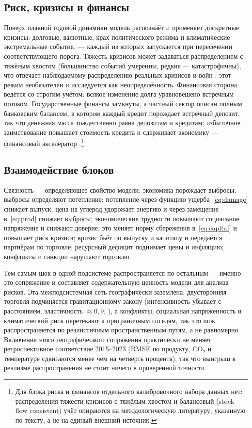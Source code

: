 \documentclass[11pt,a4paper]{article}
\begin{document}
\subsection{Риск, кризисы и финансы}

Поверх плавной годовой динамики модель распознаёт и применяет дискретные кризисы:
долговые, валютные, крах политического режима и климатические экстремальные события, ---
каждый из которых запускается при пересечении соответствующего порога. Тяжесть кризисов
может задаваться распределением с тяжёлым хвостом (большинство событий умеренны, редкие ---
катастрофичны), что отвечает наблюдаемому распределению реальных кризисов и войн
\citep{taleb2007,weitzman2009}; этот режим необязателен и исследуется как
неопределённость. Финансовая сторона ведётся со строгим учётом: всякое изменение долга
уравновешено встречным потоком. Государственные финансы замкнуты, а частный сектор
описан полным банковским балансом, в котором каждый кредит порождает встречный депозит,
так что денежная масса тождественно равна депозитам и кредитам; избыточное заимствование
повышает стоимость кредита и сдерживает экономику --- финансовый акселератор
\citep{bernanke1999,godley2007}.\footnote{Для блока риска и финансов отдельного калибровочного
набора данных нет: распределения тяжести кризисов с тяжёлым хвостом и балансовый (stock-flow
consistent) учёт опираются на методологическую литературу, указанную по тексту, а не на единый
внешний источник.}

\subsection{Взаимодействие блоков}

Связность --- определяющее свойство модели: 
экономика порождает выбросы; 
выбросы определяют потепление; 
потепление через функцию ущерба~\eqref{eq:damage} снижает выпуск;
цена на углерод удорожает энергию и через замещение в~\eqref{eq:prod} снижает выбросы;
экономические трудности повышают социальное напряжение и снижают доверие; 
это меняет норму сбережения в~\eqref{eq:capital} и повышает риск кризиса; 
кризис бьёт по выпуску и капиталу и передаётся партнёрам по торговле; 
ресурсный дефицит поднимает цены и инфляцию;
конфликты и санкции нарушают торговлю. 

Тем самым шок в одной подсистеме распространяется по остальным --- именно это сопряжение и составляет содержательную ценность модели для анализа рисков. Эта межподсистемная сеть географически заземлена: двусторонняя торговля подчиняется гравитационному закону (интенсивность убывает с расстоянием, эластичность ${\approx}0{,}9$; \citealp{headmayer2014}), а конфликты, социальная напряжённость и климатический риск перетекают к приграничным соседям, так что шок распространяется по реалистичным пространственным путям, а не равномерно. Включение этого географического сопряжения практически не меняет ретроспективное соответствие 2015--2023 (RMSE по продукту, $\mathrm{CO_2}$ и температуре сдвигаются менее чем на четверть процента), так что выигрыш в реализме распространения не стоит ничего в проверенной точности.
\end{document}
